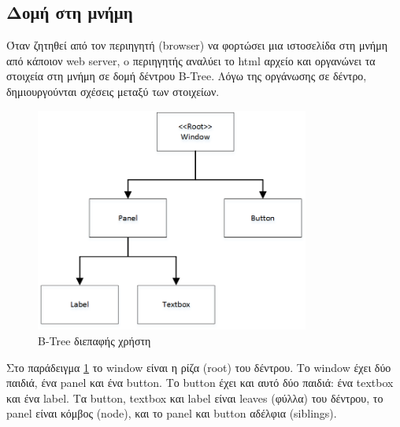 \subsection{Δομή στη μνήμη}	
Όταν ζητηθεί από τον περιηγητή (browser) να φορτώσει μια ιστοσελίδα στη μνήμη από κάποιον web server, o περιηγητής αναλύει το html αρχείο και οργανώνει τα στοιχεία στη μνήμη σε δομή δέντρου \gls{B-Tree}. Λόγω της οργάνωσης σε δέντρο, δημιουργούνται σχέσεις μεταξύ των στοιχείων.

	\begin{figure}[h!]
		\centering
		\includegraphics[width=90mm]{Images/ui_btree}
		\caption{B-Tree διεπαφής χρήστη}
		\label{fig:ui_b-tree}
	\end{figure}
	
Στο παράδειγμα \ref{fig:ui_b-tree}  το window είναι η ρίζα (root) του δέντρου. Το window έχει δύο παιδιά, ένα panel και ένα button. Το button έχει και αυτό δύο παιδιά: ένα textbox και ένα label. Τα button, textbox και label είναι leaves (φύλλα) του δέντρου, το panel είναι κόμβος (node), και το panel και button αδέλφια (siblings).


